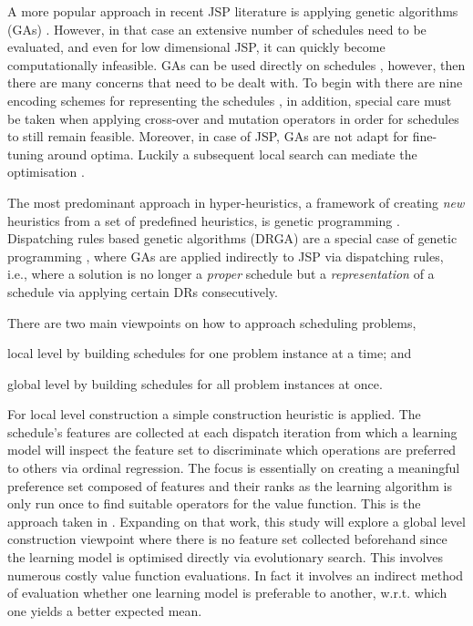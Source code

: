 \documentclass[graybox]{svmult}
\begin{document}
A more popular approach in recent JSP literature is applying genetic algorithms 
(GAs) \cite{Pinedo08}. However, in that case an extensive number of schedules 
need to be evaluated, and even for low dimensional JSP, it can quickly become 
computationally infeasible. GAs can be used directly on schedules 
\cite{Cheng96,Cheng99,Tsai07,Qing-dao-er-ji12,Ak12}, however, then there are 
many concerns that need to be dealt with. To begin with there are nine encoding 
schemes for representing the schedules \cite{Cheng96}, in addition, special 
care must be taken when applying cross-over and mutation operators in order for 
schedules to still remain feasible. Moreover, in case of JSP, GAs are not adapt 
for fine-tuning around optima. Luckily a subsequent local search can mediate 
the optimisation \cite{Cheng99}.

The most predominant approach in hyper-heuristics, a framework of creating 
\emph{new} heuristics from a set of  predefined heuristics, is genetic 
programming \cite{Burke10}. Dispatching rules based genetic algorithms (DRGA) 
\cite{Vazquez-Rodriguez09,Dhingra10,Nguyen13} are a special case of genetic 
programming \cite{Koza05}, where GAs are applied indirectly to JSP via 
dispatching rules, i.e., where a solution is no longer a \emph{proper} schedule 
but a \emph{representation} of a schedule via applying certain DRs 
consecutively. 

There are two main viewpoints on how to approach scheduling problems,
\begin{inparaenum} 
\item local level by building schedules for one problem instance at a time;
and \item global level by building schedules for all problem instances at once.
\end{inparaenum}
For local level construction a simple construction heuristic is applied. The 
schedule's features are collected at each dispatch iteration from which a 
learning model will inspect the feature set to discriminate which operations 
are preferred to others via ordinal regression. The focus is essentially on 
creating a meaningful preference set composed of features and their ranks as 
the learning algorithm is only run once to find suitable operators for the 
value function. This is the approach taken in \cite{InRu11a}. Expanding on 
that  work, this study will explore a global level construction viewpoint where 
there is no feature set collected beforehand since the learning model is 
optimised directly via evolutionary search. This involves numerous costly value 
function evaluations. In fact it involves an indirect method of evaluation 
whether one learning model is preferable to another, w.r.t. which one yields a 
better expected mean. 
\end{document}
